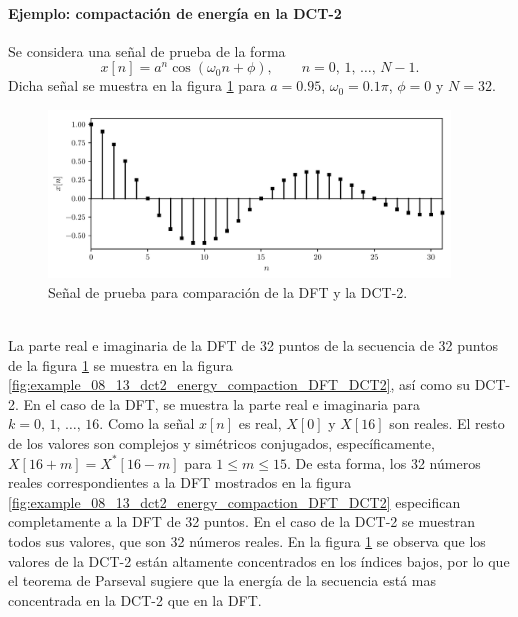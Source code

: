 \documentclass[a4paper]{report}
\begin{document}
\paragraph{Ejemplo: compactación de energía en la DCT-2} Se considera una señal de prueba de la forma 
\[
 x[n]=a^n\cos(\omega_0n+\phi),
 \qquad 
 n=0,\,1,\,\dots,\,N-1.
\]
Dicha señal se muestra en la figura \ref{fig:example_08_13_dct2_energy_compaction_x} para \(a=0.95\), \(\omega_0=0.1\pi\), \(\phi=0\) y \(N=32\). 
\begin{figure}[!htb]
 \begin{center}
 \includegraphics[width=0.95\textwidth]{figuras/example_08_13_dct2_energy_compaction_x.pdf}
 \caption{\label{fig:example_08_13_dct2_energy_compaction_x} Señal de prueba para comparación de la DFT y la DCT-2.}
 \end{center}
\end{figure}
\\
La parte real e imaginaria de la DFT de 32 puntos de la secuencia de 32 puntos de la figura \ref{fig:example_08_13_dct2_energy_compaction_x} se muestra en la figura \ref{fig:example_08_13_dct2_energy_compaction_DFT_DCT2}, así como su DCT-2. En el caso de la DFT, se muestra la parte real e imaginaria para \(k=0,\,1,\,\dots,\,16\). Como la señal \(x[n]\) es real, \(X[0]\) y \(X[16]\) son reales. El resto de los valores son complejos y simétricos conjugados, específicamente, \(X[16+m]=X^*[16-m]\) para \(1\leq m\leq 15\). De esta forma, los 32 números reales correspondientes a la DFT mostrados en la figura \ref{fig:example_08_13_dct2_energy_compaction_DFT_DCT2} especifican completamente a la DFT de 32 puntos. En el caso de la DCT-2 se muestran todos sus valores, que son 32 números reales. En la figura \ref{fig:example_08_13_dct2_energy_compaction_x} se observa que los valores de la DCT-2 están altamente concentrados en los índices bajos, por lo que el teorema de Parseval sugiere que la energía de la secuencia está mas concentrada en la DCT-2 que en la DFT.
\end{document}
